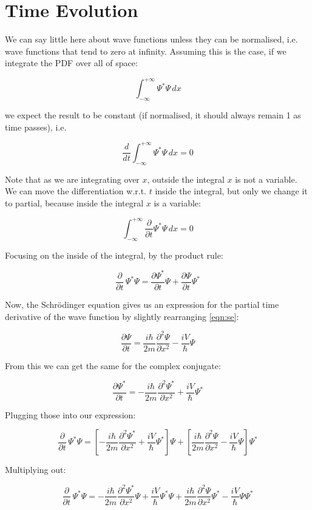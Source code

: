 \section{Time Evolution}

We can say little here about wave functions unless they can be normalised, i.e. wave functions that tend to zero at infinity. Assuming this is the case, if we integrate the PDF over all of space:

$$
\int_{-\infty}^{+\infty}
\Psi^*\Psi
\,dx
$$

we expect the result to be constant (if normalised, it should always remain 1 as time passes), i.e.

$$
\frac{d}{d t}
\int_{-\infty}^{+\infty}
\Psi^*\Psi
\,dx
= 0
$$

Note that as we are integrating over $x$, outside the integral $x$ is not a variable. We can move the differentiation w.r.t. $t$ inside the integral, but only we change it to partial, because inside the integral $x$ is a variable:

$$
\int_{-\infty}^{+\infty}
\frac{\partial}{\partial t}
\Psi^*\Psi
\,dx
= 0
$$

Focusing on the inside of the integral, by the product rule:

$$
\frac{\partial}{\partial t} \, \Psi^*\Psi
=
\frac{\partial \Psi^*}{\partial t} \Psi
+
\frac{\partial \Psi}{\partial t} \Psi^*
$$

Now, the Schrödinger equation gives us an expression for the partial time derivative of the wave function by slightly rearranging \eqref{eqn:se}:

$$
\frac{\partial \Psi}{\partial t}
=
\frac{i \hbar}{2m} \frac{\partial^2 \Psi}{\partial x^2}
- \frac{i V}{\hbar}{\Psi}
$$

From this we can get the same for the complex conjugate:

$$
\frac{\partial \Psi^*}{\partial t}
=
- \frac{i \hbar}{2m} \frac{\partial^2 \Psi^*}{\partial x^2}
+ \frac{i V}{\hbar}{\Psi^*}
$$

Plugging those into our expression:

$$
\frac{\partial}{\partial t} \, \Psi^*\Psi
=
\left[
- \frac{i \hbar}{2m} \frac{\partial^2 \Psi^*}{\partial x^2}
+ \frac{i V}{\hbar}\Psi^*
\right] \Psi
+
\left[
\frac{i \hbar}{2m} \frac{\partial^2 \Psi}{\partial x^2}
- \frac{i V}{\hbar}\Psi
\right] \Psi^*
$$

Multiplying out:

$$
\frac{\partial}{\partial t} \, \Psi^*\Psi
=
- \frac{i \hbar}{2m} \frac{\partial^2 \Psi^*}{\partial x^2}
\Psi
+ \frac{i V}{\hbar}\Psi^*\Psi
+
\frac{i \hbar}{2m} \frac{\partial^2 \Psi}{\partial x^2}
\Psi^*
- \frac{i V}{\hbar}\Psi\Psi^*
$$

